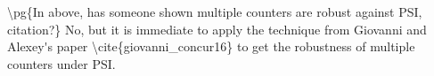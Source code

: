 \ac{\pg{In above, has someone shown multiple counters are robust against
  PSI, citation?}
No, but it is immediate to apply the technique from Giovanni and Alexey's paper 
\cite{giovanni_concur16}
to get the robustness of multiple counters under PSI.}









